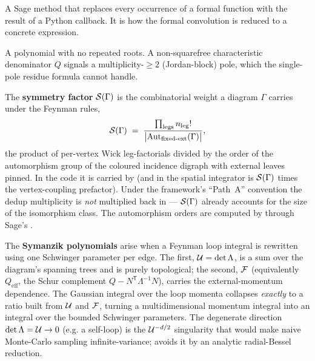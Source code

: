 \begin{description}[leftmargin=0pt,style=nextline]
  \item[\code{substitute\_function}] A Sage method that replaces every occurrence of a
        formal function with the result of a Python callback. It is how the formal
        convolution  is reduced to a concrete expression.

  \item[Squarefree polynomial] A polynomial with no repeated roots. A non-squarefree
        characteristic denominator $Q$ signals a multiplicity-$\ge 2$ (Jordan-block)
        pole, which the single-pole residue formula cannot handle.

\end{description}

\begin{defn}
The \textbf{symmetry factor} $\mathcal{S}(\Gamma)$ is the combinatorial weight a diagram
$\Gamma$ carries under the Feynman rules,
\[
  \mathcal{S}(\Gamma)\;=\;\frac{\prod_{\text{legs}} n_{\text{leg}}!}{\bigl|\mathrm{Aut}_{\text{fixed-ext}}(\Gamma)\bigr|},
\]
the product of per-vertex Wick leg-factorials divided by the order of the
automorphism group of the coloured incidence digraph with external leaves pinned.
In the code it is carried by  (and  in the
spatial integrator is $\mathcal{S}(\Gamma)$ times the vertex-coupling prefactor). Under
the framework's ``Path~A'' convention the dedup multiplicity is \emph{not}
multiplied back in --- $\mathcal{S}(\Gamma)$ already accounts for the size of the
isomorphism class. The automorphism orders are computed by  through
Sage's .
\end{defn}

\begin{defn}
The \textbf{Symanzik polynomials} arise when a Feynman loop integral is rewritten
using one Schwinger parameter per edge. The first, $\mathcal{U}=\det\Lambda$, is a sum
over the diagram's spanning trees and is purely topological; the second, $\mathcal{F}$
(equivalently $Q_{\mathrm{eff}}$, the Schur complement $Q-N^{\mathsf
T}\Lambda^{-1}N$), carries the external-momentum dependence. The Gaussian
integral over the loop momenta collapses \emph{exactly} to a ratio built from
$\mathcal{U}$ and $\mathcal{F}$, turning a multidimensional momentum integral into an
integral over the bounded Schwinger parameters. The degenerate direction
$\det\Lambda=\mathcal{U}\to 0$ (e.g. a self-loop) is the $\mathcal{U}^{-d/2}$ singularity
that would make naive Monte-Carlo sampling infinite-variance; \Daedalus{} avoids
it by an analytic radial-Bessel reduction.
\end{defn}

